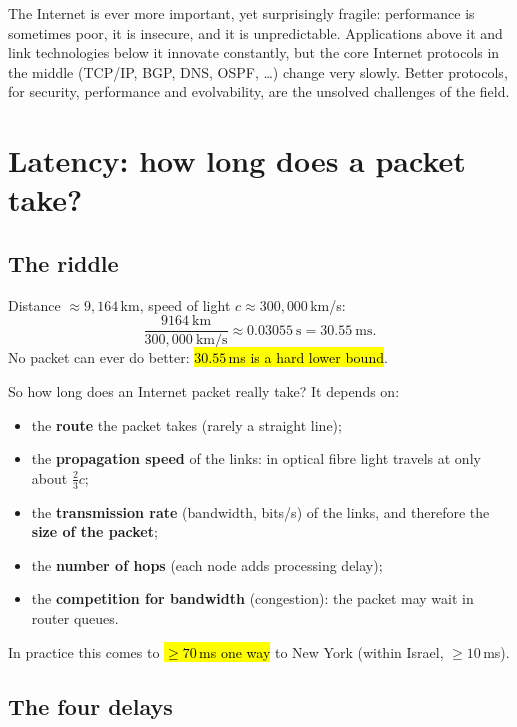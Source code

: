 \begin{intuition}
The Internet is ever more important, yet surprisingly fragile: performance is sometimes poor, it is insecure, and it is unpredictable. Applications
above it and link technologies below it innovate constantly, but the core Internet protocols in the middle (TCP/IP, BGP, DNS, OSPF, \dots)
change very slowly. Better protocols, for security, performance and evolvability, are the unsolved challenges of the field.
\end{intuition}

\section{Latency: how long does a packet take?}

\subsection{The riddle}

\begin{example}
Distance $\approx 9{,}164$\,km, speed of light $c\approx300{,}000$\,km/s:
\[ \frac{9164\ \text{km}}{300{,}000\ \text{km/s}} \approx 0.03055\ \text{s} = 30.55\ \text{ms}. \]
No packet can ever do better: \hl{$30.55$\,ms is a hard lower bound}.
\end{example}

So how long does an Internet packet really take? It depends on:
\begin{itemize}
  \item the \textbf{route} the packet takes (rarely a straight line);
  \item the \textbf{propagation speed} of the links: in optical fibre light travels at only about $\tfrac23c$;
  \item the \textbf{transmission rate} (bandwidth, bits/s) of the links, and therefore the \textbf{size of the packet};
  \item the \textbf{number of hops} (each node adds processing delay);
  \item the \textbf{competition for bandwidth} (congestion): the packet may wait in router queues.
\end{itemize}
In practice this comes to \hl{$\ge70$\,ms one way} to New York (within Israel, $\ge10$\,ms).

\subsection{The four delays}


